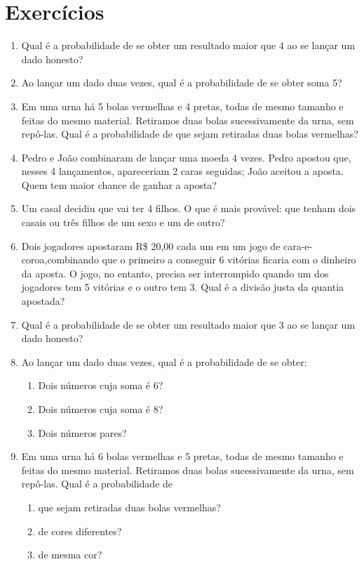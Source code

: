 \documentclass[oneside,a4paper,12pt]{article}
\begin{document}
\section{Exercícios}

\begin{enumerate} 

\item Qual é a probabilidade de se obter um resultado maior que 4 ao se lançar um dado honesto?

\item Ao lançar um dado duas vezes, qual é a probabilidade
de se obter soma 5?

\item Em uma urna há 5 bolas vermelhas e 4 pretas, todas de mesmo tamanho e feitas do mesmo material. Retiramos duas bolas sucessivamente da urna, sem repô-las. Qual é a probabilidade de que sejam retiradas duas bolas vermelhas?

\item Pedro e João combinaram de lançar uma moeda 4 vezes. Pedro apostou que, nesses 4 lançamentos, apareceriam 2 caras seguidas; João aceitou a aposta. Quem tem maior chance de ganhar a aposta?

\item Um casal decidiu que vai ter 4 filhos. O que é mais provável: que tenham dois casais ou três filhos de um sexo e um de outro?

\item Dois jogadores apostaram R\$ 20,00 cada um em um jogo de cara-e-coroa,combinando que o primeiro a conseguir 6 vitórias ficaria com o dinheiro da aposta. O jogo, no entanto, precisa ser interrompido quando um dos jogadores tem 5 vitórias e o outro tem 3. Qual é a divisão justa da quantia apostada?

\item Qual é a probabilidade de se obter um resultado maior que 3 ao se lançar um dado honesto?

\item Ao lançar um dado duas vezes, qual é a probabilidade
de se obter:
\begin{enumerate}
\item Dois números cuja soma é 6?
\item Dois números cuja soma é 8?
\item Dois números pares?
\end{enumerate}

\item Em uma urna há 6 bolas vermelhas e 5 pretas, todas de mesmo tamanho e feitas do mesmo material. Retiramos duas bolas sucessivamente da urna, sem repô-las. Qual é a probabilidade de
\begin{enumerate}
\item que sejam retiradas duas bolas vermelhas?
\item de cores diferentes?
\item de mesma cor?
\end{enumerate}


\end{enumerate}
\end{document}

